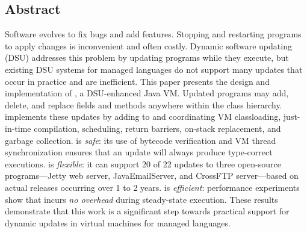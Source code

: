 \subsection*{Abstract}
Software evolves to fix bugs and add features. Stopping and restarting
programs to apply changes is inconvenient and often costly.  Dynamic
software updating (DSU) addresses this problem by updating programs
while they execute, but existing DSU systems for managed languages do
not support many updates that occur in practice and are inefficient.
This paper presents the design and implementation of \DSU, a
DSU-enhanced Java VM.  Updated programs may add, delete, and replace fields
and methods anywhere within the class hierarchy.  \DSU{} implements
these updates by adding to and coordinating VM classloading,
just-in-time compilation, scheduling, return barriers, on-stack
replacement, and garbage collection.  \DSU{} is \emph{safe}: its use
of bytecode verification and VM thread synchronization ensures that an
update will always produce type-correct executions. \DSU{} is
\emph{flexible}: it can support 20 of 22 updates to three
open-source programs---Jetty web server, JavaEmailServer, and CrossFTP
server---based on actual releases occurring over 1 to 2 years.
\DSU{} is \emph{efficient}: performance experiments show that
\DSU{} incurs \emph{no overhead} during steady-state execution.  These
results demonstrate that this work is a significant step towards
practical support for 
dynamic updates in virtual machines for managed languages.

